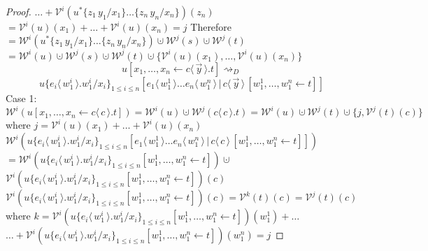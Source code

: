 \documentclass[a4paper,UKenglish,cleveref, autoref]{lipics-v2019}
\newcommand{\set}[1]{ \{ #1 \} }
\newcommand{\app}[2]{#1 \, #2}
\newcommand{\fake}[3]{#1 \langle \, #2 \, \rangle . #3}
\newcommand{\share}[3]{#1 [#2 \leftarrow #3]}
\newcommand{\dist}[5]{#1 [ #2 \, \vert \, \fakedist{#4}{#5} \, #3 ]}
\newcommand{\fakedist}[2]{#1 \langle \, #2 \, \rangle}
\newcommand{\sub}[3]{#1 \{ #2 / #3 \}}
\newcommand{\weight}[2]{\mathcal{W}^{#1}(#2)}
\newcommand{\weightvar}[2]{\mathcal{V}^{#1}(#2)}
\begin{document}
\begin{proof}
\newline
\indent $\dots + \weightvar{i}{\sub{\sub{u^{*}}{\app{z_{1}}{y_{1}}}{x_{1}}\dots}{\app{z_{n}}{y_{n}}}{x_{n}}}(z_{n})$
\newline
$= \weightvar{i}{u}(x_{1}) + \dots + \weightvar{i}{u}(x_{n}) = j$
\newline
Therefore
\newline
$= \weight{i}{\sub{\sub{u^{*}}{\app{z_{1}}{y_{1}}}{x_{1}}\dots}{\app{z_{n}}{y_{n}}}{x_{n}}} \cupdot \weight{j}{s} \cupdot \weight{j}{t}$
\newline
$= \weight{i}{u} \cupdot \weight{j}{s} \cupdot \weight{j}{t} \cupdot \set{\weightvar{i}{u}(x_{1}) , \dots , \weightvar{i}{u}(x_{n})}$
\newline
$$\share{u}{x_{1}, \dots, x_{n}}{\fake{c}{\vec{y}}{t}} \rightsquigarrow_{D}$$
$$\sub{u}{\fake{e_{i}}{w^{i}_{1}}{w^{i}_{1}}}{x_{i}}_{1 \leq i \leq n} \dist{}{\fakedist{e_{1}}{w^{1}_{1}} \dots \fakedist{e_{n}}{w^{n}_{1}}}{\share{}{w^{1}_{1}, \dots, w^{n}_{1}}{t}}{c}{\vec{y}}$$
Case 1:
\newline
$\weight{i}{\share{u}{x_{1}, \dots, x_{n}}{\fake{c}{c}{t}}} = \weight{i}{u} \cupdot \weight{j}{\fake{c}{c}{t}} =  \weight{i}{u} \cupdot \weight{j}{t} \cupdot \set{j, \weightvar{j}{t}(c)}$
\newline
where $j = \weightvar{i}{u}(x_{1}) + \dots + \weightvar{i}{u}(x_{n}) $
\newline
$\weight{i}{\sub{u}{\fake{e_{i}}{w^{i}_{1}}{w^{i}_{1}}}{x_{i}}_{1 \leq i \leq n} \dist{}{\fakedist{e_{1}}{w^{1}_{1}} \dots \fakedist{e_{n}}{w^{n}_{1}}}{\share{}{w^{1}_{1}, \dots, w^{n}_{1}}{t}}{c}{c}}$
\newline
$= \weight{i}{\sub{u}{\fake{e_{i}}{w^{i}_{1}}{w^{i}_{1}}}{x_{i}}_{1 \leq i \leq n} \share{}{w^{1}_{1}, \dots, w^{n}_{1}}{t}} \cupdot $
\newline
\indent $\weightvar{i}{\sub{u}{\fake{e_{i}}{w^{i}_{1}}{w^{i}_{1}}}{x_{i}}_{1 \leq i \leq n} \share{}{w^{1}_{1}, \dots, w^{n}_{1}}{t}}(c)$
\newline
$\weightvar{i}{\sub{u}{\fake{e_{i}}{w^{i}_{1}}{w^{i}_{1}}}{x_{i}}_{1 \leq i \leq n} \share{}{w^{1}_{1}, \dots, w^{n}_{1}}{t}}(c) = \weightvar{k}{t}(c) = \weightvar{j}{t}(c)$
\newline
where $k = \weightvar{i}{\sub{u}{\fake{e_{i}}{w^{i}_{1}}{w^{i}_{1}}}{x_{i}}_{1 \leq i \leq n} \share{}{w^{1}_{1}, \dots, w^{n}_{1}}{t}}(w^{1}_{1}) + \dots$
\newline
\indent $\dots + \weightvar{i}{\sub{u}{\fake{e_{i}}{w^{i}_{1}}{w^{i}_{1}}}{x_{i}}_{1 \leq i \leq n} \share{}{w^{1}_{1}, \dots, w^{n}_{1}}{t}}(w^{n}_{1}) = j$

\end{proof}
\end{document}
